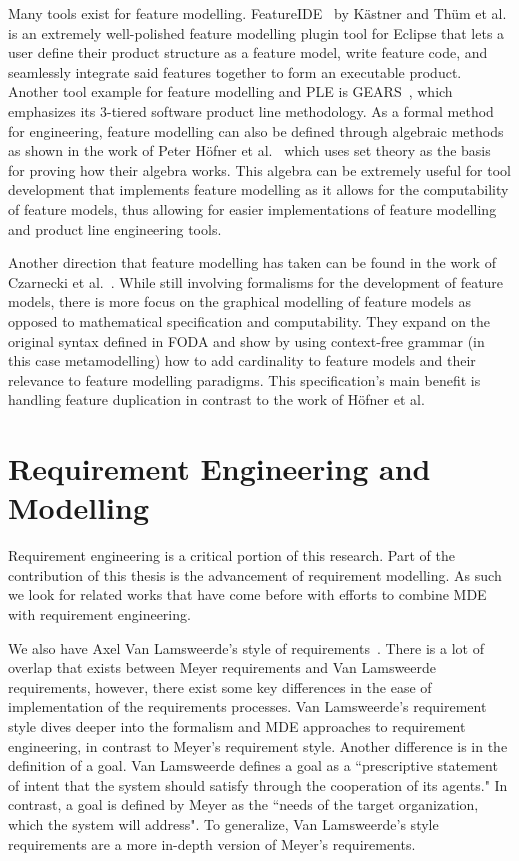 Many tools exist for feature modelling. FeatureIDE~\cite{kastner2009featureide, thum2014featureide} by K\"{a}stner and Th{\"u}m et al. is an extremely well-polished feature modelling plugin tool for Eclipse that lets a user define their product structure as a feature model, write feature code, and seamlessly integrate said features together to form an executable product. Another tool example for feature modelling and PLE is GEARS~\cite{GEARS}, which emphasizes its 3-tiered software product line methodology. As a formal method for engineering, feature modelling can also be defined through algebraic methods as shown in the work of Peter H\"{o}fner et al.~\cite{hofner2006feature,hofner2011algebra} which uses set theory as the basis for proving how their algebra works. This algebra can be extremely useful for tool development that implements feature modelling as it allows for the computability of feature models, thus allowing for easier implementations of feature modelling and product line engineering tools.

Another direction that feature modelling has taken can be found in the work of Czarnecki et al.~\cite{czarnecki2004staged}. While still involving formalisms for the development of feature models, there is more focus on the graphical modelling of feature models as opposed to mathematical specification and computability. They expand on the original syntax defined in FODA and show by using context-free grammar (in this case metamodelling) how to add cardinality to feature models and their relevance to feature modelling paradigms. This specification's main benefit is handling feature duplication in contrast to the work of H\"{o}fner et al.

\section{Requirement Engineering and Modelling}

Requirement engineering is a critical portion of this research. Part of the contribution of this thesis is the advancement of requirement modelling. As such we look for related works that have come before with efforts to combine \ac{MDE} with requirement engineering.

We also have Axel Van Lamsweerde's style of requirements~\cite{lamsweerde2009requirements}. There is a lot of overlap that exists between Meyer requirements and Van Lamsweerde requirements, however, there exist some key differences in the ease of implementation of the requirements processes. Van Lamsweerde's requirement style dives deeper into the formalism and MDE approaches to requirement engineering, in contrast to Meyer's requirement style. Another difference is in the definition of a goal. Van Lamsweerde defines a goal as a ``prescriptive statement of intent that the system should satisfy through the cooperation of its agents." In contrast, a goal is defined by Meyer as the ``needs of the target organization, which the system will address". To generalize, Van Lamsweerde's style requirements are a more in-depth version of Meyer's requirements. 

